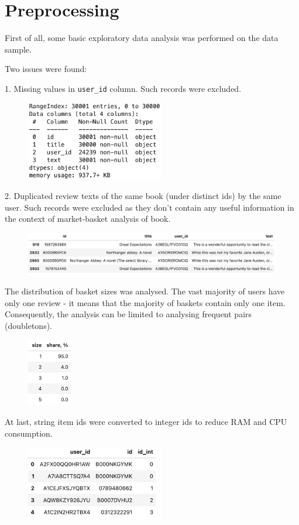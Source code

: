 % 
% 
\chapter{Preprocessing}
\label{chap:preprocessing}

First of all, some basic exploratory data analysis was performed on the data sample.


Two issues were found:

1. Missing values in \texttt{user\_id} column.
Such records were excluded.
\begin{figure}[h]
	\includegraphics[width=6cm]{images/3-df_info}
\centering
\end{figure}


2. Duplicated review texts of the same book (under distinct ids) by the same user. 
Such records were excluded as they don't contain any useful information in the context of market-basket analysis of book. 

\begin{figure}[h]
	\includegraphics[width=14cm]{images/3-duplicated_reviews}
\centering
\end{figure}


The distribution of basket sizes was analysed. The vast majority of users have only one review - it means that the majority of baskets contain only one item.
Consequently, the analysis can be limited to analysing frequent pairs (doubletons).

\begin{figure}[h]
	\includegraphics[width=2cm]{images/3-basket_size_histogram}
\centering
\end{figure}

\newpage



At last, string item ids were converted to integer ids to reduce RAM and CPU consumption.

\begin{figure}[h]
	\includegraphics[width=6cm]{images/3-df_head}
\centering
\end{figure}


